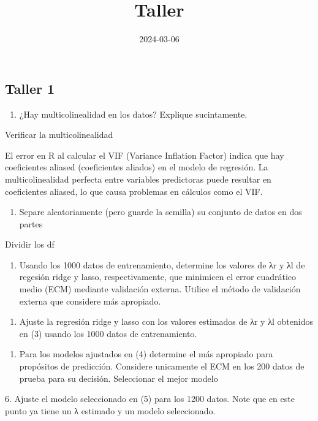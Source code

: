 \documentclass[
]{article}
\title{Taller\textbar{}}
\author{}
\date{\vspace{-2.5em}2024-03-06}
\providecommand{\tightlist}{%
  \setlength{\itemsep}{0pt}\setlength{\parskip}{0pt}}
\begin{document}
\maketitle

\hypertarget{taller-1}{%
\subsection{Taller 1}\label{taller-1}}

\begin{enumerate}
\def\labelenumi{(\arabic{enumi})}
\tightlist
\item
  ¿Hay multicolinealidad en los datos? Explique sucintamente.
\end{enumerate}

Verificar la multicolinealidad

El error en R al calcular el VIF (Variance Inflation Factor) indica que
hay coeficientes aliased (coeficientes aliados) en el modelo de
regresión. La multicolinealidad perfecta entre variables predictoras
puede resultar en coeficientes aliased, lo que causa problemas en
cálculos como el VIF.

\begin{enumerate}
\def\labelenumi{(\arabic{enumi})}
\setcounter{enumi}{1}
\tightlist
\item
  Separe aleatoriamente (pero guarde la semilla) su conjunto de datos en
  dos partes
\end{enumerate}

Dividir los df

\begin{enumerate}
\def\labelenumi{\arabic{enumi})}
\setcounter{enumi}{2}
\tightlist
\item
  Usando los 1000 datos de entrenamiento, determine los valores de λr y
  λl de regesión ridge y lasso, respectivamente, que minimicen el error
  cuadrático medio (ECM) mediante validación externa. Utilice el método
  de validación externa que considere más apropiado.
\end{enumerate}

\begin{enumerate}
\def\labelenumi{(\arabic{enumi})}
\setcounter{enumi}{3}
\tightlist
\item
  Ajuste la regresión ridge y lasso con los valores estimados de λr y λl
  obtenidos en (3) usando los 1000 datos de entrenamiento.
\end{enumerate}

\begin{enumerate}
\def\labelenumi{\arabic{enumi})}
\setcounter{enumi}{4}
\tightlist
\item
  Para los modelos ajustados en (4) determine el más apropiado para
  propósitos de predicción. Considere unicamente el ECM en los 200 datos
  de prueba para su decisión. Seleccionar el mejor modelo
\end{enumerate}

6. Ajuste el modelo seleccionado en (5) para los 1200 datos. Note que en
este punto ya tiene un λ estimado y un modelo seleccionado.
\end{document}
